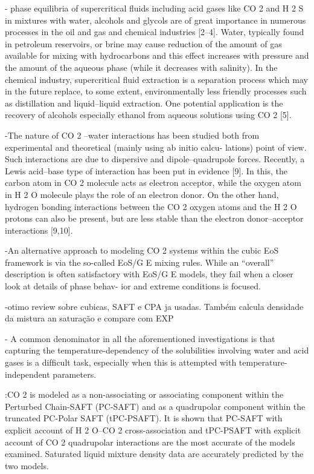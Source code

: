 - phase equilibria of supercritical ﬂuids including acid gases like CO 2 and H 2 S in mixtures with water, alcohols and glycols are of great importance in numerous processes in the oil and gas and chemical industries [2–4]. Water, typically found in petroleum reservoirs, or brine may cause reduction of the amount of gas available for mixing with hydrocarbons and this effect increases with pressure and the amount of the aqueous phase (while it decreases with salinity). In the chemical industry, supercritical ﬂuid extraction is a separation process which may in the future replace, to some extent, environmentally less friendly processes such as distillation and
liquid–liquid extraction. One potential application is the recovery
of alcohols especially ethanol from aqueous solutions using CO 2
[5].

-The nature of CO 2 –water interactions has been studied both
from experimental and theoretical (mainly using ab initio calcu-
lations) point of view. Such interactions are due to dispersive
and dipole–quadrupole forces. Recently, a Lewis acid–base type of
interaction has been put in evidence [9]. In this, the carbon atom in
CO 2 molecule acts as electron acceptor, while the oxygen atom in
H 2 O molecule plays the role of an electron donor. On the other hand,
hydrogen bonding interactions between the CO 2 oxygen atoms and
the H 2 O protons can also be present, but are less stable than the
electron donor–acceptor interactions [9,10].

-An alternative approach to modeling CO 2 systems within the
cubic EoS framework is via the so-called EoS/G E mixing rules. While an “overall” description is often satisfactory with EoS/G E
models, they fail when a closer look at details of phase behav-
ior and extreme conditions is focused.

-otimo review sobre cubicas, SAFT e CPA ja usadas. Também calcula densidade da mistura an saturação e compare com EXP

- A common denominator in all the aforementioned investigations is that capturing the temperature-dependency of the solubilities involving water and acid gases is a difﬁcult task, especially when this is attempted with temperature-independent parameters.



\cite{Diamontonis2012}:CO 2 is modeled as a non-associating or associating component within the Perturbed Chain-SAFT (PC-SAFT) and as a quadrupolar component within the truncated PC-Polar SAFT (tPC-PSAFT). It is shown that PC-SAFT with explicit account of H 2 O–CO 2 cross-association and tPC-PSAFT with explicit account of CO 2 quadrupolar interactions are the most accurate of the models examined. Saturated liquid mixture density data are accurately predicted by the two models.

